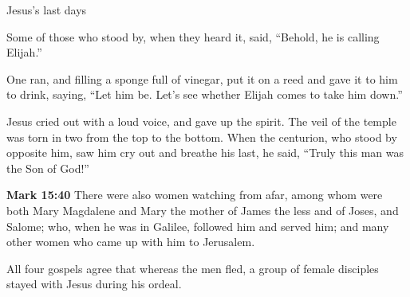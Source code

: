 \documentclass[10pt,twoside]{article} %
\newcommand{\doimage}[2]{\texttt{[image: \#2]}\label{fig:#2}}
\newcommand{\figbasic}[4]{ %
    \ifthenelse{\isodd{\pageref{fig:#2}}}{}{\hfill}
    \ifstrempty{#3}{
      \doimage{#1}{#2}
    }{
      \makebox{\doimage{#1}{#2} \\ #3}
    }
    \ifthenelse{\isodd{\pageref{fig:#2}}}{\hfill}{}
    \par
}
\newcommand{\fig}[2][0.4]{
  \figbasic{#1}{#2}{}{}
}
\newcommand{\quotesize}{\normalsize{}}
\newcommand{\comm}[1]{\begingroup \color{black!50} #1\endgroup}
\newenvironment{quotetext}{\begingroup\quotesize}{\endgroup}
\newcommand{\intex}[1]{\index[texts]{#1}}
\newcommand{\bible}[2]{\begin{quotetext}\textbf{#1}\intex{#1} #2\end{quotetext}}
\newcommand{\gospelmark}[2]{\bible{Mark #1}{#2}}
\begin{document}
\begin{section}{Jesus's last days}
{  Some of those who stood by, when they heard it, said, ``Behold, he is calling Elijah.''

  One ran, and filling a sponge full of vinegar, put it on a reed and gave it to him to drink, saying, ``Let him be. Let's see whether Elijah comes to take him down.''

  Jesus cried out with a loud voice, and gave up the spirit.   The veil of the temple was torn in two from the top to the bottom.   
When the centurion, who stood by opposite him, saw him cry out and breathe his last, he said, ``Truly this man was the Son of God!''}

\fig[0.6]{what-our-lord-saw-from-the-cross-detail}

\gospelmark{15:40}{
  There were also women watching from afar, among whom were both Mary Magdalene and Mary the mother of James the less and of Joses, and Salome;   who, when he was in Galilee, followed him and served him; and many other women who came up with him to Jerusalem.
}

\comm{All four gospels agree that whereas the men fled, a group of female disciples stayed with Jesus during his ordeal.}

\end{section}

\fig{resurrection-mary-magdalene}
\end{document}
